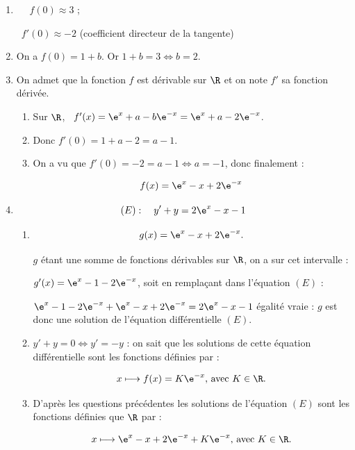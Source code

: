 \begin{enumerate}
\item ~
\starredbullet~$f(0) \approx 3$ ;

\starredbullet~$f'(0) \approx - 2$ (coefficient directeur de la tangente)
\item 
On a $f(0) = 1 + b$. Or $1 + b = 3 \iff b = 2$.
\item On admet que la fonction $f$ est dérivable sur $\R$ et on note $f'$ sa fonction dérivée. 
	\begin{enumerate}
		\item 
Sur $\R$, \, $f'(x) = \e^x + a - b\e^{-x} = \e^x + a - 2\e^{-x}$.
		\item 
Donc $f'(0) = 1 + a - 2 = a - 1$.
		\item 
		On a vu que $f'(0) = - 2 = a - 1 \iff a = - 1$, donc finalement :
		
		\[f(x) = \e^x - x + 2\e^{-x}\]
	\end{enumerate}
\item 

\[(E) : \quad  y' + y = 2\e^x - x - 1\]

	\begin{enumerate}
		\item 
		
\[g(x) = \e^x - x + 2\e^{-x}.\]

$g$ étant une somme de fonctions dérivables sur $\R$, on a sur cet intervalle :

$g'(x) = \e^x - 1 - 2\e^{-x}$, soit en remplaçant dans l'équation $(E)$ :

$\e^x - 1 - 2\e^{-x} + \e^x - x + 2\e^{-x} = 2\e^x - x - 1$ égalité vraie : $g$ est donc une solution de l'équation différentielle $(E)$.


		\item 
$y' + y = 0 \iff y' = - y$ : on sait que les solutions de cette équation différentielle sont les fonctions définies par :

\[ x \longmapsto f(x) = K \e^{- x},\, \text{avec } K \in \R.\]

		\item 
D'après les questions précédentes les solutions de l'équation $(E)$ sont les fonctions définies que $\R$ par :

\[ x \longmapsto \e^x - x + 2\e^{-x} + K \e^{- x},\, \text{avec } K \in \R.\]
	\end{enumerate}
\end{enumerate}

\bigskip

